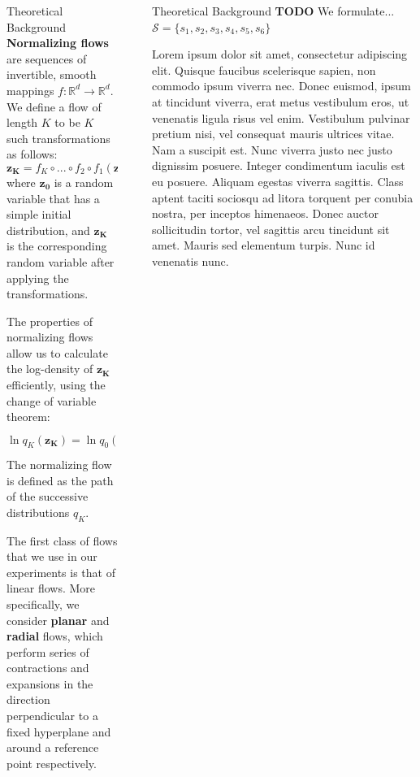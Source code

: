 \documentclass[final,hyperref={pdfpagelabels=false}]{beamer}
\newcommand{\shrink}{-15pt}
\begin{document}
\begin{frame}[t]
\begin{columns}[t]
\begin{column}{.3\textwidth}
    \begin{block}{Theoretical Background}
    \textbf{Normalizing flows} are sequences of invertible, smooth mappings $f:\mathbb{R}^d\rightarrow \mathbb{R}^d$. We define a flow of length $K$ to be $K$ such transformations as follows:
    \[ \mathbf{z_K} = f_K \circ ... \circ f_2 \circ f_1 (\mathbf{z_0}) \] 
    where $\mathbf{z_0}$ is a random variable that has a simple initial distribution, and $\mathbf{z_K}$ is the corresponding random variable after applying the transformations.
    
    The properties of normalizing flows allow us to calculate the log-density of $\mathbf{z_K}$ efficiently, using the change of variable theorem:
    \[ \ln q_K(\mathbf{z_K}) = \ln q_0(\mathbf{z_0}) - \sum_{k=1}^{K} \ln \left| \det \frac{\partial f_k}{\partial \mathbf{z_{k-1}}} \right| \]
    The normalizing flow is defined as the path of the successive distributions $q_K$.
    
    The first class of flows that we use in our experiments is that of linear flows. More specifically, we consider \textbf{planar} and \textbf{radial} flows, which perform series of contractions and expansions in the direction perpendicular to a fixed hyperplane and around a reference point respectively.
          
    \end{block}
  \end{column} %


  \begin{column}{.02\textwidth}\end{column} %

  \begin{column}{.3\textwidth} %
    \vspace{\shrink}
    \begin{block}{Theoretical Background}
      \textbf{TODO} We formulate... $\mathcal S = \{s_1, s_2, s_3, s_4, s_5, s_6 \}$
      
          Lorem ipsum dolor sit amet, consectetur adipiscing elit. Quisque faucibus scelerisque sapien, non commodo ipsum viverra nec. Donec euismod, ipsum at tincidunt viverra, erat metus vestibulum eros, ut venenatis ligula risus vel enim. Vestibulum pulvinar pretium nisi, vel consequat mauris ultrices vitae. Nam a suscipit est. Nunc viverra justo nec justo dignissim posuere. Integer condimentum iaculis est eu posuere. Aliquam egestas viverra sagittis. Class aptent taciti sociosqu ad litora torquent per conubia nostra, per inceptos himenaeos. Donec auctor sollicitudin tortor, vel sagittis arcu tincidunt sit amet. Mauris sed elementum turpis. Nunc id venenatis nunc.


\end{block}
\end{column}
\end{columns}
\end{frame}
\end{document}
